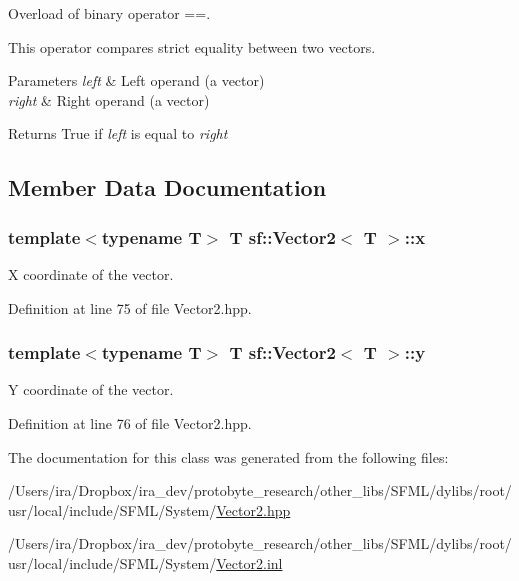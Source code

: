 Overload of binary operator ==. 

This operator compares strict equality between two vectors.


\begin{DoxyParams}{Parameters}
{\em left} & Left operand (a vector) \\
\hline
{\em right} & Right operand (a vector)\\
\hline
\end{DoxyParams}
\begin{DoxyReturn}{Returns}
True if {\itshape left} is equal to {\itshape right} 
\end{DoxyReturn}


\subsection{Member Data Documentation}
\hypertarget{classsf_1_1_vector2_a1e6ad77fa155f3753bfb92699bd28141}{
\subsubsection[{x}]{\setlength{\rightskip}{0pt plus 5cm}template$<$typename T$>$ T {\bf sf\-::\-Vector2}$<$ T $>$\-::{\bf x}}}\label{classsf_1_1_vector2_a1e6ad77fa155f3753bfb92699bd28141}


X coordinate of the vector. 



Definition at line 75 of file Vector2.\-hpp.

\hypertarget{classsf_1_1_vector2_a420f2481b015f4eb929c75f2af564299}{
\subsubsection[{y}]{\setlength{\rightskip}{0pt plus 5cm}template$<$typename T$>$ T {\bf sf\-::\-Vector2}$<$ T $>$\-::{\bf y}}}\label{classsf_1_1_vector2_a420f2481b015f4eb929c75f2af564299}


Y coordinate of the vector. 



Definition at line 76 of file Vector2.\-hpp.



The documentation for this class was generated from the following files\-:\begin{DoxyCompactItemize}
\item 
/\-Users/ira/\-Dropbox/ira\-\_\-dev/protobyte\-\_\-research/other\-\_\-libs/\-S\-F\-M\-L/dylibs/root/usr/local/include/\-S\-F\-M\-L/\-System/\hyperlink{_vector2_8hpp}{Vector2.\-hpp}\item 
/\-Users/ira/\-Dropbox/ira\-\_\-dev/protobyte\-\_\-research/other\-\_\-libs/\-S\-F\-M\-L/dylibs/root/usr/local/include/\-S\-F\-M\-L/\-System/\hyperlink{_vector2_8inl}{Vector2.\-inl}\end{DoxyCompactItemize}
